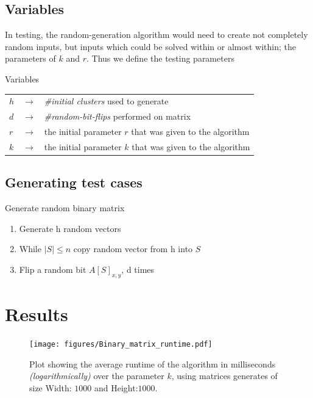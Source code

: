 \documentclass{beamer}
\begin{document}
\subsection{Variables}
\begin{frame}
  In testing, the random-generation algorithm would need to create not completely random inputs, but
  inputs which could be solved within or almost within; the parameters of $k$ and $r$. Thus we define
  the testing parameters

  \begin{block}{Variables}
    \begin{tabular}{lll}
      $h$ & $\rightarrow$ & \textit{\#initial clusters} used to generate              \\
      $d$ & $\rightarrow$ & \textit{\#random-bit-flips} performed on matrix           \\
      $r$ & $\rightarrow$ & the initial parameter $r$ that was given to the algorithm \\
      $k$ & $\rightarrow$ & the initial parameter $k$ that was given to the algorithm \\
    \end{tabular}
  \end{block}
\end{frame}

\subsection{Generating test cases}
\begin{frame}
  \begin{block}{Generate random binary matrix}
    \begin{enumerate}
      \item<1-> Generate \alert{h} random vectors
      \item<2-> While $|S| \leq n$ copy random vector from \alert{h} into $S$
      \item<3-> Flip a random bit $A[S]_{x,y}$, \alert{d} times
    \end{enumerate}
  \end{block}
\end{frame}

\section{Results}
\begin{frame}
  \begin{figure}
    \centering
    \texttt{[image: figures/Binary\_matrix\_runtime.pdf]}
    \caption{Plot showing the average runtime of the algorithm in milliseconds \textit{(logarithmically)}
      over the parameter $k$, using matrices generates of size Width: $1000$ and Height:$1000$.}
  \end{figure}
\end{frame}
\end{document}
